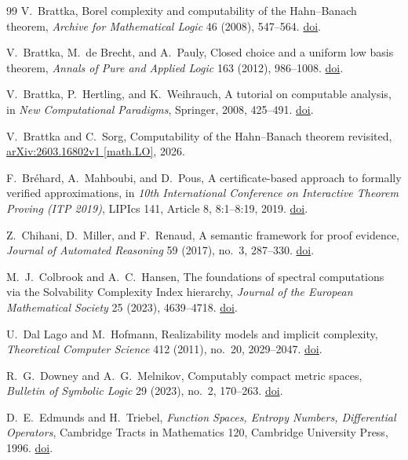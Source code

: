 \documentclass[11pt]{article}
\theoremstyle{definition}
\begin{document}
\begin{thebibliography}{99}
V.~Brattka,
Borel complexity and computability of the Hahn--Banach theorem,
\emph{Archive for Mathematical Logic} 46 (2008), 547--564.
\href{https://doi.org/10.1007/s00153-007-0057-z}{doi}.

V.~Brattka, M.~de Brecht, and A.~Pauly,
Closed choice and a uniform low basis theorem,
\emph{Annals of Pure and Applied Logic} 163 (2012), 986--1008.
\href{https://doi.org/10.1016/j.apal.2011.12.020}{doi}.

V.~Brattka, P.~Hertling, and K.~Weihrauch,
A tutorial on computable analysis,
in \emph{New Computational Paradigms}, Springer, 2008, 425--491.
\href{https://doi.org/10.1007/978-0-387-68546-5_18}{doi}.

V.~Brattka and C.~Sorg,
Computability of the Hahn--Banach theorem revisited,
\href{https://arxiv.org/abs/2603.16802v1}{arXiv:2603.16802v1 [math.LO]}, 2026.

F.~Br\'ehard, A.~Mahboubi, and D.~Pous,
A certificate-based approach to formally verified approximations,
in \emph{10th International Conference on Interactive Theorem Proving (ITP 2019)},
LIPIcs 141, Article 8, 8:1--8:19, 2019.
\href{https://doi.org/10.4230/LIPIcs.ITP.2019.8}{doi}.

Z.~Chihani, D.~Miller, and F.~Renaud,
A semantic framework for proof evidence,
\emph{Journal of Automated Reasoning} 59 (2017), no.~3, 287--330.
\href{https://doi.org/10.1007/s10817-016-9380-6}{doi}.

M.~J.~Colbrook and A.~C.~Hansen,
The foundations of spectral computations via the Solvability Complexity Index hierarchy,
\emph{Journal of the European Mathematical Society} 25 (2023), 4639--4718.
\href{https://doi.org/10.4171/JEMS/1289}{doi}.

U.~Dal Lago and M.~Hofmann,
Realizability models and implicit complexity,
\emph{Theoretical Computer Science} 412 (2011), no.~20, 2029--2047.
\href{https://doi.org/10.1016/j.tcs.2010.12.025}{doi}.

R.~G.~Downey and A.~G.~Melnikov,
Computably compact metric spaces,
\emph{Bulletin of Symbolic Logic} 29 (2023), no.~2, 170--263.
\href{https://doi.org/10.1017/bsl.2023.16}{doi}.

D.~E.~Edmunds and H.~Triebel,
\emph{Function Spaces, Entropy Numbers, Differential Operators},
Cambridge Tracts in Mathematics 120, Cambridge University Press, 1996.
\href{https://doi.org/10.1017/CBO9780511662201}{doi}.


\end{thebibliography}
\end{document}
